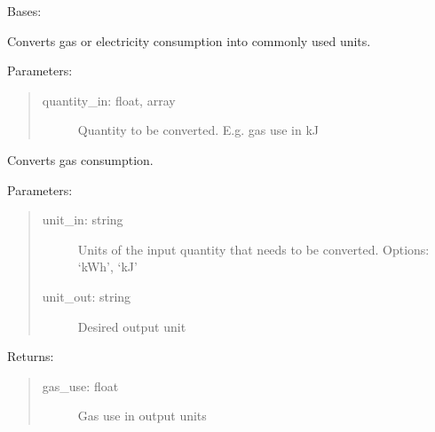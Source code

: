 \documentclass[letterpaper,10pt,english,openany]{sphinxmanual}
\begin{document}

\begin{fulllineitems}
\label{\detokenize{source/mswh.tools:mswh.tools.unit_converters.Utility}}
Bases: 

Converts gas or electricity
consumption into commonly used units.

Parameters:
\begin{quote}
\begin{description}
\item[{quantity\_in: float, array}] \leavevmode
Quantity to be converted.
E.g. gas use in kJ

\end{description}
\end{quote}

\begin{fulllineitems}
\label{\detokenize{source/mswh.tools:mswh.tools.unit_converters.Utility.gas}}
Converts gas consumption.

Parameters:
\begin{quote}
\begin{description}
\item[{unit\_in: string}] \leavevmode
Units of the input quantity that needs
to be converted.
Options: ‘kWh’, ‘kJ’

\item[{unit\_out: string}] \leavevmode
Desired output unit

\end{description}
\end{quote}

Returns:
\begin{quote}
\begin{description}
\item[{gas\_use: float}] \leavevmode
Gas use in output units

\end{description}
\end{quote}

\end{fulllineitems}


\end{fulllineitems}
\end{document}
